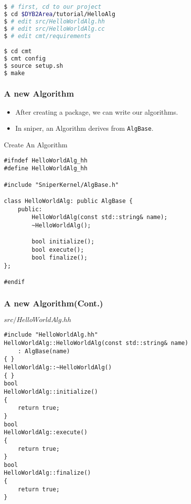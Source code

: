 \newsavebox{\createalg}
\begin{lrbox}{\createalg}
\begin{lstlisting}[language=bash]
$ # first, cd to our project
$ cd $DYB2Area/tutorial/HelloAlg
$ # edit src/HelloWorldAlg.hh
$ # edit src/HelloWorldAlg.cc
$ # edit cmt/requirements

$ cd cmt
$ cmt config
$ source setup.sh
$ make
\end{lstlisting}
\end{lrbox}

\begin{frame}
    \frametitle{A new Algorithm}
    \begin{itemize}
        \item After creating a package, we can write our algorithms.
        \item In sniper, an Algorithm derives from {\tt AlgBase}.
    \end{itemize}
    \begin{block}{Create An Algorithm}
        \par\usebox{\createalg}
    \end{block}
\end{frame}

\newsavebox{\createalgheader}
\begin{lrbox}{\createalgheader}
\begin{lstlisting}
#ifndef HelloWorldAlg_hh
#define HelloWorldAlg_hh

#include "SniperKernel/AlgBase.h"

class HelloWorldAlg: public AlgBase {
    public:
        HelloWorldAlg(const std::string& name);
        ~HelloWorldAlg();

        bool initialize();
        bool execute();
        bool finalize();
};

#endif
\end{lstlisting}
\end{lrbox}

\begin{frame}
    \frametitle{A new Algorithm(Cont.)}
    \begin{block}{\(src/HelloWorldAlg.hh\)}
        \par\usebox{\createalgheader}
    \end{block}
\end{frame}

\newsavebox{\createalgimpl}
\begin{lrbox}{\createalgimpl}
\begin{lstlisting}
#include "HelloWorldAlg.hh"
HelloWorldAlg::HelloWorldAlg(const std::string& name)
    : AlgBase(name)
{ }
HelloWorldAlg::~HelloWorldAlg()
{ }
bool
HelloWorldAlg::initialize()
{
    return true;
}
bool
HelloWorldAlg::execute()
{
    return true;
}
bool
HelloWorldAlg::finalize()
{
    return true;
}
\end{lstlisting}
\end{lrbox}

